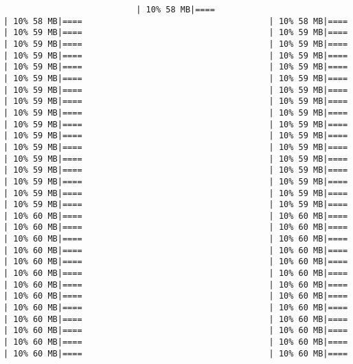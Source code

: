 \documentclass[
]{article}
\begin{document}
\begin{verbatim}
                           | 10% 58 MB|====                                      | 10% 58 MB|====                                      | 10% 58 MB|====                                      | 10% 59 MB|====                                      | 10% 59 MB|====                                      | 10% 59 MB|====                                      | 10% 59 MB|====                                      | 10% 59 MB|====                                      | 10% 59 MB|====                                      | 10% 59 MB|====                                      | 10% 59 MB|====                                      | 10% 59 MB|====                                      | 10% 59 MB|====                                      | 10% 59 MB|====                                      | 10% 59 MB|====                                      | 10% 59 MB|====                                      | 10% 59 MB|====                                      | 10% 59 MB|====                                      | 10% 59 MB|====                                      | 10% 59 MB|====                                      | 10% 59 MB|====                                      | 10% 59 MB|====                                      | 10% 59 MB|====                                      | 10% 59 MB|====                                      | 10% 59 MB|====                                      | 10% 59 MB|====                                      | 10% 59 MB|====                                      | 10% 59 MB|====                                      | 10% 59 MB|====                                      | 10% 59 MB|====                                      | 10% 59 MB|====                                      | 10% 59 MB|====                                      | 10% 59 MB|====                                      | 10% 59 MB|====                                      | 10% 59 MB|====                                      | 10% 60 MB|====                                      | 10% 60 MB|====                                      | 10% 60 MB|====                                      | 10% 60 MB|====                                      | 10% 60 MB|====                                      | 10% 60 MB|====                                      | 10% 60 MB|====                                      | 10% 60 MB|====                                      | 10% 60 MB|====                                      | 10% 60 MB|====                                      | 10% 60 MB|====                                      | 10% 60 MB|====                                      | 10% 60 MB|====                                      | 10% 60 MB|====                                      | 10% 60 MB|====                                      | 10% 60 MB|====                                      | 10% 60 MB|====                                      | 10% 60 MB|====                                      | 10% 60 MB|====                                      | 10% 60 MB|====                                      | 10% 60 MB|====                                      | 10% 60 MB|====                                      | 10% 60 MB|====                                      | 10% 60 MB|====                                      | 10% 60 MB|====                                      | 10% 60 MB|====                                    
\end{verbatim}
\end{document}
